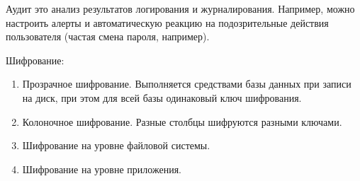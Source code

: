 \begin{remark}
  Аудит это анализ результатов логирования и журналирования. Например, можно
  настроить алерты и автоматическую реакцию на подозрительные действия
  пользователя (частая смена пароля, например).
\end{remark}

Шифрование:

\begin{enumerate}
\item
  Прозрачное шифрование. Выполняется средствами базы данных при записи на диск,
  при этом для всей базы одинаковый ключ шифрования.

\item
  Колоночное шифрование. Разные столбцы шифруются разными ключами.

\item
  Шифрование на уровне файловой системы.

\item
  Шифрование на уровне приложения.
\end{enumerate}
